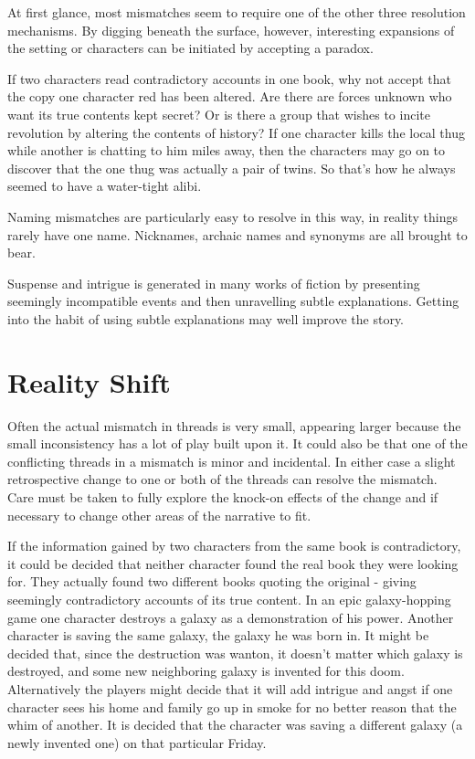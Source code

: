 \documentclass[twoside]{book}
\begin{document}
At first glance, most mismatches seem to require one of the other
three resolution mechanisms. By digging beneath the surface, however,
interesting expansions of the setting or characters can be initiated
by accepting a paradox.

If two characters read contradictory accounts in one book, why not
accept that the copy one character red has been altered. Are there are
forces unknown who want its true contents kept secret? Or is there a
group that wishes to incite revolution by altering the contents of
history? If one character kills the local thug while another is
chatting to him miles away, then the characters may go on to discover
that the one thug was actually a pair of twins. So that's how he
always seemed to have a water-tight alibi.

Naming mismatches are particularly easy to resolve in this way, in
reality things rarely have one name. Nicknames, archaic names and
synonyms are all brought to bear.

Suspense and intrigue is generated in many works of fiction by
presenting seemingly incompatible events and then unravelling subtle
explanations. Getting into the habit of using subtle explanations may
well improve the story.

\section{Reality Shift}

Often the actual mismatch in threads is very small, appearing larger
because the small inconsistency has a lot of play built upon it. It
could also be that one of the conflicting threads in a mismatch is
minor and incidental. In either case a slight retrospective change to
one or both of the threads can resolve the mismatch. Care must be
taken to fully explore the knock-on effects of the change and if
necessary to change other areas of the narrative to fit.

If the information gained by two characters from the same book is
contradictory, it could be decided that neither character found the
real book they were looking for. They actually found two different
books quoting the original - giving seemingly contradictory accounts
of its true content. In an epic galaxy-hopping game one character
destroys a galaxy as a demonstration of his power. Another character
is saving the same galaxy, the galaxy he was born in. It might be
decided that, since the destruction was wanton, it doesn't matter
which galaxy is destroyed, and some new neighboring galaxy is
invented for this doom. Alternatively the players might decide that it
will add intrigue and angst if one character sees his home and family
go up in smoke for no better reason that the whim of another. It is
decided that the character was saving a different galaxy (a newly
invented one) on that particular Friday.
\end{document}
